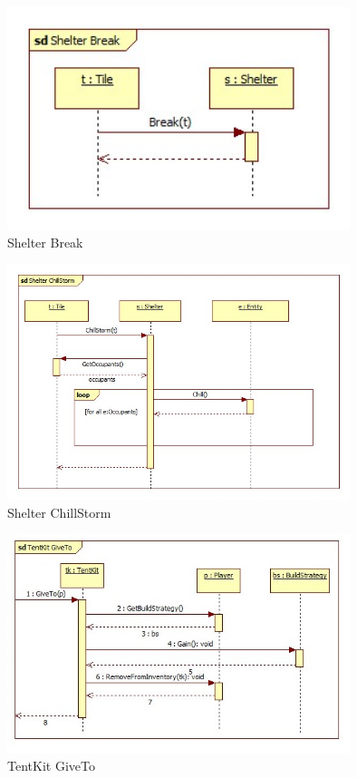 \begin{figure}[H]
        \begin{center}
                \includegraphics[width=10cm]{chapters/chapter07/seqdiag/Shelter_Break.jpg}
                \caption{Shelter Break}
                \label{Shelter Break}
        \end{center}
\end{figure}
\begin{figure}[H]
        \begin{center}
                \includegraphics[width=10cm]{chapters/chapter07/seqdiag/Shelter_ChillStorm.jpg}
                \caption{Shelter ChillStorm}
                \label{Shelter ChillStorm}
        \end{center}
\end{figure}
\begin{figure}[H]
        \begin{center}
                \includegraphics[width=10cm]{chapters/chapter07/seqdiag/TentKit_GiveTo.jpg}
                \caption{TentKit GiveTo}
                \label{TentKit GiveTo}
        \end{center}
\end{figure}
